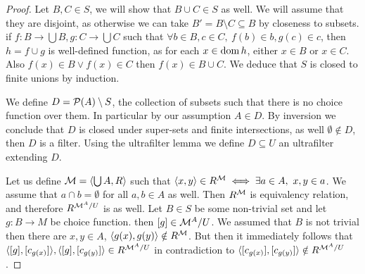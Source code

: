 \begin{proof}
	Let $B, C \in S$, we will show that $B \cup C \in S$ as well.
	We will assume that they are disjoint, as otherwise we can take $B' = B \setminus C \subseteq B$ by closeness to subsets.
	if $f : B \to \bigcup B, g : C \to \bigcup C$ such that $\forall b \in B, c \in C,\ f(b) \in b, g(c) \in c$, then $h = f \cup g$ is well-defined function,
	as for each $x \in \operatorname{dom} h$, either $x \in B$ or $x \in C$.
	Also $f(x) \in B \lor f(x) \in C$ then $f(x) \in B \cup C$.
	We deduce that $S$ is closed to finite unions by induction.

	We define $D = \mathcal{P}(A) \setminus S$, the collection of subsets such that there is no choice function over them. In particular by our assumption $A \in D$.
	By inversion we conclude that $D$ is closed under super-sets and finite intersections, as well $\emptyset \notin D$, then $D$ is a filter.
	Using the ultrafilter lemma we define $D \subseteq U$ an ultrafilter extending $D$.

	Let us define $\mathcal{M} = \langle \bigcup A, R \rangle$ such that $\langle x, y \rangle \in R^{\mathcal{M}} \iff \exists a \in A,\ x, y \in a$.
	We assume that $a \cap b = \emptyset$ for all $a, b \in A$ as well.
	Then $R^{\mathcal{M}}$ is equivalency relation, and therefore $R^{\mathcal{M}^A / U}$ is as well.
	Let $B \in S$ be some non-trivial set and let $g : B \to M$ be choice function.
	then $[g] \in \mathcal{M}^A / U$.
	We assumed that $B$ is not trivial then there are $x, y \in A$, $\langle g(x), g(y) \rangle \notin R^{\mathcal{M}}$.
	But then it immediately follows that $\langle [g], [c_{g(x)}] \rangle, \langle [g], [c_{g(y)}] \rangle \in R^{\mathcal{M}^A / U}$ in contradiction to $\langle [c_{g(x)}], [c_{g(y)}] \rangle \notin R^{\mathcal{M}^A / U}$.
\end{proof}

